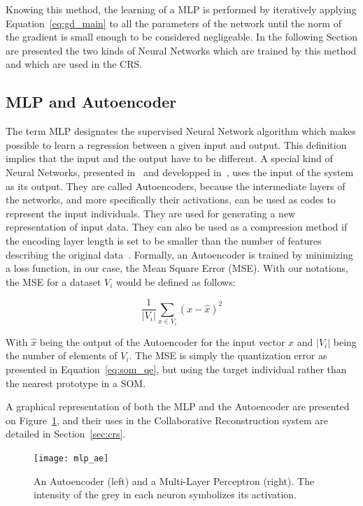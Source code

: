     Knowing this method, the learning of a MLP is performed by iteratively applying Equation~\ref{eq:gd_main} to all the parameters of the network until the norm of the gradient is small enough to be considered negligeable. In the following Section are presented the two kinds of Neural Networks which are trained by this method and which are used in the CRS.\@

    \subsection{MLP and Autoencoder}

    The term MLP designates the supervised Neural Network algorithm which makes possible to learn a regression between a given input and output. This definition implies that the input and the output have to be different. A special kind of Neural Networks, presented in~\cite{hinton2006reducing} and developped in~\cite{vincent2008extracting}, uses the input of the system as its output. They are called Autoencoders, because the intermediate layers of the networks, and more specifically their activations, can be used as codes to represent the input individuals. They are used for generating a new representation of input data. They can also be used as a compression method if the encoding layer length is set to be smaller than the number of features describing the original data~\cite{hinton2006reducing}. Formally, an Autoencoder is trained by minimizing a loss function, in our case, the Mean Square Error (MSE). With our notations, the MSE for a dataset $V_i$ would be defined as follows:
		
		\begin{equation}
            \frac{1}{|V_i|}\sum_{x \in V_i}{(x - \hat{x})}^2
		\end{equation}
		
        With $\hat{x}$ being the output of the Autoencoder for the input vector $x$ and $|V_i|$ being the number of elements of $V_i$. The MSE is simply the quantization error as presented in Equation~\ref{eq:som_qe}, but using the target individual rather than the nearest prototype in a SOM.\@

    A graphical representation of both the MLP and the Autoencoder are presented on Figure~\ref{fig:mlp_ae}, and their uses in the Collaborative Reconstruction system are detailed in Section~\ref{sec:crs}.

    \begin{figure}[h]
        \centering
        \texttt{[image: mlp\_ae]}
        \caption{An Autoencoder (left) and a Multi-Layer Perceptron (right). The intensity of the grey in each neuron symbolizes its activation.}
\label{fig:mlp_ae}
    \end{figure}
    
